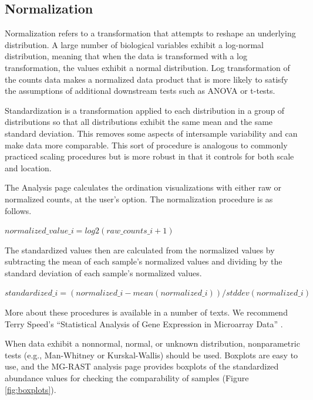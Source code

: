 \documentclass[12pt,fullpage]{report}
\begin{document}
\subsection{Normalization}

Normalization refers to a transformation that attempts to reshape an underlying distribution. A large number of biological variables exhibit a log-normal distribution, meaning that when the data is transformed with a log transformation, the values exhibit a normal distribution. Log transformation of the counts data makes a normalized data product that is more likely to satisfy the assumptions  of additional downstream tests such as ANOVA or t-tests.

Standardization is a transformation applied to each distribution in a group of distributions so that all distributions exhibit the same mean and the same standard deviation. This removes some aspects of intersample variability and can make data more comparable. This sort of procedure is analogous to commonly practiced scaling procedures but is more robust in that it controls for both scale and location.

The Analysis page calculates the ordination visualizations with either raw or normalized counts, at the user's option. The normalization procedure is
as follows.

\begin{small}
\begin{math}
normalized\_value\_i = log2(raw\_counts\_i + 1)
\end{math}
\end{small}

\noindent
The standardized values then are calculated from the normalized values by subtracting the mean of each sample's normalized values and dividing by the standard deviation of each sample's normalized values.

\begin{small}
\begin{math}
standardized\_i = (normalized\_i - mean(normalized\_i)) / stddev(normalized\_i)
\end{math}
\end{small}

More about these procedures is available in a number of texts. We recommend Terry Speed's ``Statistical Analysis of Gene Expression in Microarray Data'' \cite{1584883278}.

When data exhibit a nonnormal, normal, or unknown distribution, nonparametric tests (e.g., Man-Whitney or Kurskal-Wallis) should be used. Boxplots are easy to use, and the MG-RAST analysis page provides boxplots of the standardized abundance values for checking the comparability of samples (Figure \ref{fig:boxplots}).
\end{document}
